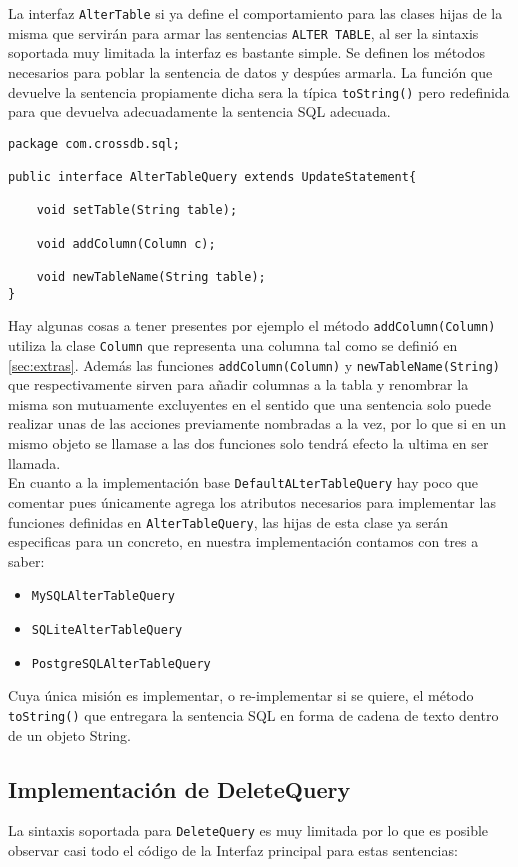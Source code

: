 La interfaz \verb=AlterTable= si ya define el comportamiento para las clases hijas de la misma que servirán para armar las sentencias \verb=ALTER TABLE=, al ser la sintaxis soportada muy limitada la interfaz es bastante simple. Se definen los métodos necesarios para poblar la sentencia de datos y despúes armarla. La función que devuelve la sentencia propiamente dicha sera la típica \verb=toString()= pero redefinida para que devuelva adecuadamente la sentencia SQL adecuada. 

\begin{lstlisting}[title=interfaz AlterTableQuery]
package com.crossdb.sql;

public interface AlterTableQuery extends UpdateStatement{
	
	void setTable(String table);
	
	void addColumn(Column c);
	
	void newTableName(String table);
}
\end{lstlisting}
Hay algunas cosas a tener presentes por ejemplo el método \verb=addColumn(Column)= utiliza la clase \verb=Column= que representa una columna tal como se definió en \ref{sec:extras}. Además las funciones \verb=addColumn(Column)= y \verb=newTableName(String)= que respectivamente sirven para añadir columnas a la tabla y renombrar la misma son mutuamente excluyentes en el sentido que una sentencia solo puede realizar unas de las acciones previamente nombradas a la vez, por lo que si en un mismo objeto se llamase a las dos funciones solo tendrá efecto la ultima en ser llamada.\\

En cuanto a la implementación base \verb=DefaultALterTableQuery= hay poco que comentar pues únicamente agrega los atributos necesarios para implementar las funciones definidas en \verb=AlterTableQuery=, las hijas de esta clase ya serán especificas para un \dd concreto, en nuestra implementación contamos con tres a saber:
\begin{itemize}
\item \verb=MySQLAlterTableQuery=
\item \verb=SQLiteAlterTableQuery=
\item \verb=PostgreSQLAlterTableQuery=
\end{itemize}
Cuya única misión es implementar, o re-implementar si se quiere, el método \verb=toString()= que entregara la sentencia SQL en forma de cadena de texto dentro de un objeto String.




\subsection{Implementación de DeleteQuery}
La sintaxis soportada para \verb=DeleteQuery= es muy limitada por lo que es posible observar casi todo el código de la Interfaz principal para estas sentencias:

